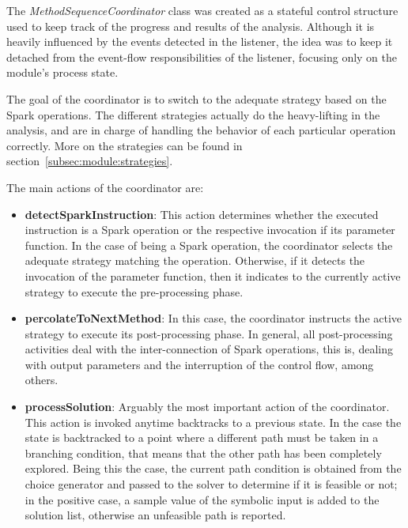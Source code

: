 
The \textit{MethodSequenceCoordinator} class was created as a stateful control structure used to keep track of the progress and results of the analysis. Although it is heavily influenced by the events detected in the listener, the idea was to keep it detached from the event-flow responsibilities of the listener, focusing only on the module's process state.

The goal of the coordinator is to switch to the adequate strategy based on the Spark operations. The different strategies actually do the heavy-lifting in the analysis, and are in charge of handling the behavior of each particular operation correctly. More on the strategies can be found in section~\ref{subsec:module:strategies}.

The main actions of the coordinator are:

\begin{itemize}
	\item \textbf{detectSparkInstruction}: This action determines whether the executed instruction is a Spark operation or the respective invocation if its parameter function. In the case of being a Spark operation, the coordinator selects the adequate strategy matching the operation. Otherwise, if it detects the invocation of the parameter function, then it indicates to the currently active strategy to execute the pre-processing phase.
	\item \textbf{percolateToNextMethod}: In this case, the coordinator instructs the active strategy to execute its post-processing phase. In general, all post-processing activities deal with the inter-connection of Spark operations, this is, dealing with output parameters and the interruption of the control flow, among others.
	\item \textbf{processSolution}: Arguably the most important action of the coordinator. This action is invoked anytime \jpf{} backtracks to a previous state. In the case the state is backtracked to a point where a different path must be taken in a branching condition, that means that the other path has been completely explored. Being this the case, the current path condition is obtained from the choice generator and passed to the solver to determine if it is feasible or not; in the positive case, a sample value of the symbolic input is added to the solution list, otherwise an unfeasible path is reported.
\end{itemize}

